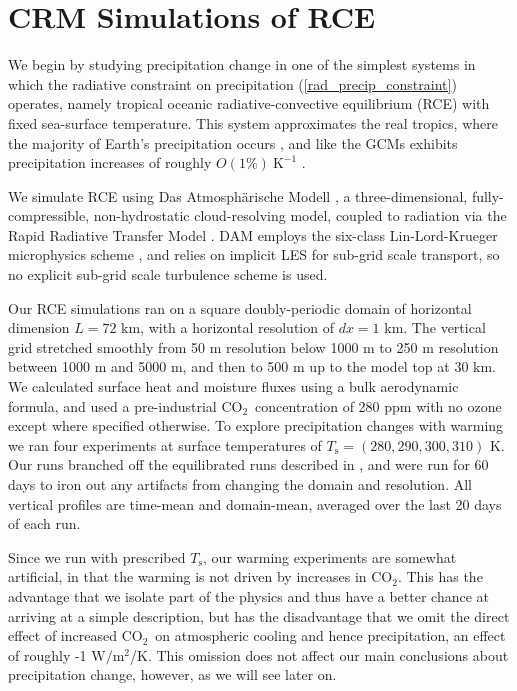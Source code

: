\documentclass[10pt]{article}
\newcommand{\eqnref}[1]{(\ref{#1})}
\newcommand{\cotwo}{\ensuremath{\mathrm{CO_2}}}
\newcommand{\Wmsq}{\ensuremath{\mathrm{W/m^2}}}
\newcommand{\Ts}{\ensuremath{T_\mathrm{s}}}
\newcommand{\Kinverse}{\ensuremath{\mathrm{K^{-1}}}}
\begin{document}
\section{CRM Simulations of RCE}
We begin by studying precipitation change in one of the simplest systems in which the radiative constraint on precipitation \eqnref{rad_precip_constraint} operates, namely tropical oceanic radiative-convective equilibrium (RCE) with fixed sea-surface temperature. This system approximates the real tropics, where the majority of Earth's precipitation occurs \citep{simpson1988}, and like the GCMs exhibits precipitation increases of roughly $O(1\%)\ \Kinverse$ \citep{romps2011, muller2011b}.  

We simulate RCE using Das Atmosph\"arische Modell \citep[DAM,][]{romps2008},   a three-dimensional, fully-compressible, non-hydrostatic cloud-resolving model, coupled to radiation via the Rapid Radiative Transfer Model 
\citep[RRTM,][]{mlawer1997}. DAM employs the six-class Lin-Lord-Krueger  microphysics scheme \citep{lin1983, lord1984, krueger1995}, and relies on implicit LES \citep{margolin2006} for sub-grid scale transport, so no explicit sub-grid scale turbulence scheme is used.
	
	Our RCE simulations ran on a square doubly-periodic domain of horizontal dimension $L=72$ km, with  a horizontal resolution of $dx=1$ km. The vertical grid stretched smoothly from 50 m resolution below 1000 m to 250 m resolution between 1000 m and 5000 m, and then to 500 m up to the model top at  30 km. We calculated surface heat and moisture fluxes using a bulk aerodynamic formula, and used a pre-industrial \cotwo\  concentration of 280 ppm with no ozone except where specified otherwise. To explore precipitation changes  with warming we ran four experiments at surface temperatures of $\Ts=(280,290,300,310)$ K. Our runs branched off the equilibrated runs described in \cite{romps2014}, and were run for 60 days  to iron out any artifacts from changing the domain and resolution. All vertical profiles are time-mean and domain-mean, averaged over the last 20 days of each run. 

Since we run with prescribed \Ts, our warming experiments are somewhat artificial, in that the warming is not driven by increases in \cotwo. This has the advantage that we isolate part of the physics and thus have a better chance at arriving at a simple description, but has the disadvantage that we omit the direct effect of increased \cotwo\ on atmospheric cooling and hence precipitation, an effect of roughly -1 \Wmsq/K. This omission does not affect our main conclusions about precipitation change, however, as we will see later on.
\end{document}
